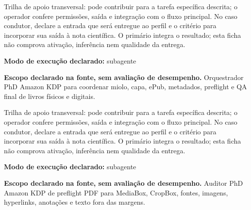 \begin{funcao}
Trilha de apoio transversal: pode contribuir para a tarefa específica descrita; o operador confere permissões, saída e integração com o fluxo principal. No caso condutor, declare a entrada que será entregue ao perfil e o critério para incorporar sua saída à nota científica. O primário integra o resultado; esta ficha não comprova ativação, inferência nem qualidade da entrega.
\end{funcao}

\begin{arquitetura}
\textbf{Modo de execução declarado:} subagente
\end{arquitetura}


\begin{descricao}
\textbf{Escopo declarado na fonte, sem avaliação de desempenho.}
Orquestrador PhD Amazon KDP para coordenar miolo, capa, ePub, metadados, preflight e QA final de livros físicos e digitais.
\end{descricao}

\begin{funcao}
Trilha de apoio transversal: pode contribuir para a tarefa específica descrita; o operador confere permissões, saída e integração com o fluxo principal. No caso condutor, declare a entrada que será entregue ao perfil e o critério para incorporar sua saída à nota científica. O primário integra o resultado; esta ficha não comprova ativação, inferência nem qualidade da entrega.
\end{funcao}

\begin{arquitetura}
\textbf{Modo de execução declarado:} subagente
\end{arquitetura}


\begin{descricao}
\textbf{Escopo declarado na fonte, sem avaliação de desempenho.}
Auditor PhD Amazon KDP de preflight PDF para MediaBox, CropBox, fontes, imagens, hyperlinks, anotações e texto fora das margens.
\end{descricao}

